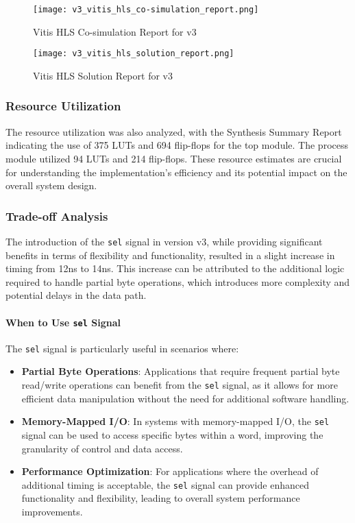 \documentclass[conference]{IEEEtran}
\begin{document}
\begin{figure}[htbp]
    \centering
    \texttt{[image: v3\_vitis\_hls\_co-simulation\_report.png]}
    \caption{Vitis HLS Co-simulation Report for v3}
    \label{fig:v3_vitis_hls_co-simulation_report}
\end{figure}

\begin{figure}[h]
    \centering
    \texttt{[image: v3\_vitis\_hls\_solution\_report.png]}
    \caption{Vitis HLS Solution Report for v3}
    \label{fig:v3_vitis_hls_solution_report}
\end{figure}

\subsubsection{Resource Utilization}
The resource utilization was also analyzed, with the Synthesis Summary Report indicating the use of 375 LUTs and 694 flip-flops for the top module. The process module utilized 94 LUTs and 214 flip-flops. These resource estimates are crucial for understanding the implementation's efficiency and its potential impact on the overall system design.

\subsubsection{Trade-off Analysis}
The introduction of the \texttt{sel} signal in version v3, while providing significant benefits in terms of flexibility and functionality, resulted in a slight increase in timing from 12ns to 14ns. This increase can be attributed to the additional logic required to handle partial byte operations, which introduces more complexity and potential delays in the data path.

\paragraph{When to Use \texttt{sel} Signal}
The \texttt{sel} signal is particularly useful in scenarios where:
\begin{itemize}
    \item \textbf{Partial Byte Operations}: Applications that require frequent partial byte read/write operations can benefit from the \texttt{sel} signal, as it allows for more efficient data manipulation without the need for additional software handling.
    \item \textbf{Memory-Mapped I/O}: In systems with memory-mapped I/O, the \texttt{sel} signal can be used to access specific bytes within a word, improving the granularity of control and data access.
    \item \textbf{Performance Optimization}: For applications where the overhead of additional timing is acceptable, the \texttt{sel} signal can provide enhanced functionality and flexibility, leading to overall system performance improvements.
\end{itemize}
\end{document}
